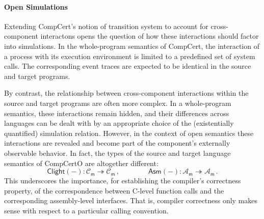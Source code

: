 \documentclass[acmsmall,screen,review,anonymous]{acmart}
\newcommand{\kw}[1]{\ensuremath{ \mathsf{#1} }}
\begin{document}

\paragraph{Open Simulations} %

Extending CompCert's notion of transition system
to account for cross-component interactons
opens the question of
how these interactions should factor into simulations.
In the whole-program semantics of CompCert,
the interaction of a process with its execution environment
is limited to a predefined set of system calls.
The corresponding event traces
are expected to be identical in the source and target programs.

By contrast,
the relationship between
cross-component interactions
within the source and target programs
are often more complex.
In a whole-program semantics,
these interactions remain hidden,
and their differences across languages
can be dealt with by an appropriate choice of the
(existentially quantified) simulation relation.
However,
in the context of open semantics
these interactions are revealed
and become part of the component's externally observable behavior.
In fact,
the types of the source and target language semantics of CompCertO
are altogether different:
\[
  \kw{Clight}(-) : \mathcal{C}_\kw{m} \twoheadrightarrow \mathcal{C}_\kw{m}
  \,,
  \qquad \qquad
  \kw{Asm}(-) : \mathcal{A}_\kw{m} \twoheadrightarrow \mathcal{A}_\kw{m}
  \,.
\]
%
%
This underscores the importance,
for establishing the compiler's correctness property,
of the correspondence between
C-level function calls
and the corresponding assembly-level interfaces.
That is, compiler correctness only makes sense
with respect to a particular calling convention.
\end{document}
